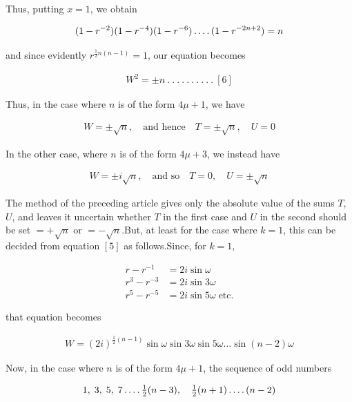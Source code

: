 Thus, putting $x=1$, we obtain

\[
\begin{aligned}
(1-r^{-2})(1-r^{-4})(1-r^{-6})\mathinner{.\,.\,.\,.}(1-r^{-2n+2})=n
\end{aligned}
\]

and since evidently $r^{\frac12n(n-1)}=1$, our equation becomes

\[
\begin{aligned}
W^2=\pm n\  .\  .\  .\  .\  .\  .\  .\  .\  .\  .\ [6]
\end{aligned}
\]

Thus, in the case where $n$ is of the form $4\mu+1$, we have

\[
\begin{aligned}
W=\pm\surd n,\quad\text{and hence}\quad T=\pm\surd n,\quad U=0
\end{aligned}
\]

In the other case, where $n$ is of the form $4\mu+3$, we instead have

\[
\begin{aligned}
W=\pm i\surd n,\quad\text{and so}\quad T=0,\quad U=\pm\surd n
\end{aligned}
\]


The method of the preceding article gives only the absolute value of the sums $T$, $U$, and leaves it uncertain whether $T$ in the first case and $U$ in the second should be set $=+\surd n$ or $=-\surd n$.\quad But, at least for the case where $k=1$, this can be decided from equation $[5]$ as follows.\quad Since, for $k=1$,


\[
\begin{aligned}
r-r^{-1}&=2i\sin\omega\\
r^3-r^{-3}&=2i\sin3\omega\\
r^5-r^{-5}&=2i\sin5\omega\;\text{etc.}
\end{aligned}
\]

that equation becomes

\[
\begin{aligned}
W=(2i)^{\frac12(n-1)}\sin\omega\sin3\omega\sin5\omega\ldots\sin(n-2)\omega
\end{aligned}
\]

Now, in the case where $n$ is of the form $4\mu+1$, the sequence of odd numbers

\[
\begin{aligned}
1,\;3,\;5,\;7\mathinner{.\,.\,.\,.}\tfrac12(n-3),\quad\tfrac12(n+1)\mathinner{.\,.\,.\,.}(n-2)
\end{aligned}
\]

